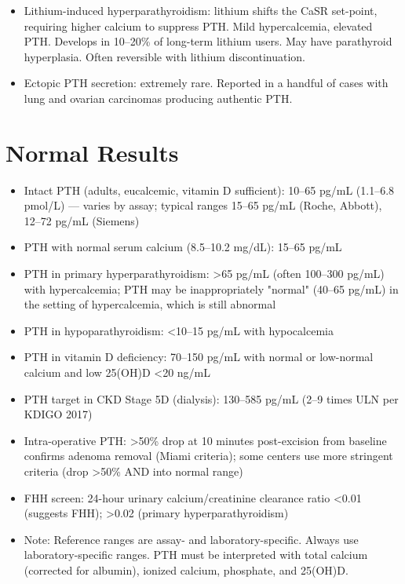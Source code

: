 \begin{itemize}
  \item Lithium-induced hyperparathyroidism: lithium shifts the CaSR set-point, requiring higher calcium to suppress PTH. Mild hypercalcemia, elevated PTH. Develops in 10--20\% of long-term lithium users. May have parathyroid hyperplasia. Often reversible with lithium discontinuation.
  \item Ectopic PTH secretion: extremely rare. Reported in a handful of cases with lung and ovarian carcinomas producing authentic PTH.
\end{itemize}

\section*{Normal Results}
\begin{itemize}
  \item Intact PTH (adults, eucalcemic, vitamin D sufficient): 10--65 pg/mL (1.1--6.8 pmol/L) --- varies by assay; typical ranges 15--65 pg/mL (Roche, Abbott), 12--72 pg/mL (Siemens)
  \item PTH with normal serum calcium (8.5--10.2 mg/dL): 15--65 pg/mL
  \item PTH in primary hyperparathyroidism: >65 pg/mL (often 100--300 pg/mL) with hypercalcemia; PTH may be inappropriately "normal" (40--65 pg/mL) in the setting of hypercalcemia, which is still abnormal
  \item PTH in hypoparathyroidism: <10--15 pg/mL with hypocalcemia
  \item PTH in vitamin D deficiency: 70--150 pg/mL with normal or low-normal calcium and low 25(OH)D <20 ng/mL
  \item PTH target in CKD Stage 5D (dialysis): 130--585 pg/mL (2--9 times ULN per KDIGO 2017)
  \item Intra-operative PTH: >50\% drop at 10 minutes post-excision from baseline confirms adenoma removal (Miami criteria); some centers use more stringent criteria (drop >50\% AND into normal range)
  \item FHH screen: 24-hour urinary calcium/creatinine clearance ratio <0.01 (suggests FHH); >0.02 (primary hyperparathyroidism)
  \item Note: Reference ranges are assay- and laboratory-specific. Always use laboratory-specific ranges. PTH must be interpreted with total calcium (corrected for albumin), ionized calcium, phosphate, and 25(OH)D.
\end{itemize}

